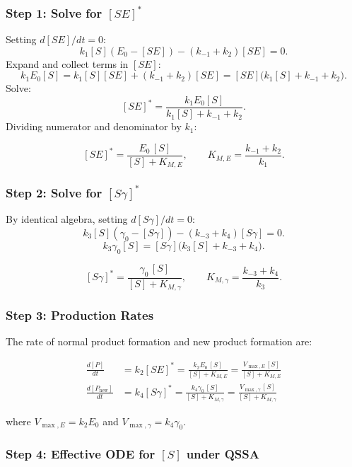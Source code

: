 \documentclass[12pt]{article}
\newcommand{\KME}{K_{M,E}}
\newcommand{\KMg}{K_{M,\gamma}}
\begin{document}
\subsubsection*{Step 1: Solve for $[SE]^*$}

Setting $d[SE]/dt = 0$:
\[
  k_1[S](E_0 - [SE]) - (k_{-1} + k_2)[SE] = 0.
\]
Expand and collect terms in $[SE]$:
\[
  k_1 E_0 [S] = k_1[S][SE] + (k_{-1} + k_2)[SE] = [SE]\bigl(k_1[S] + k_{-1} + k_2\bigr).
\]
Solve:
\[
  [SE]^* = \frac{k_1 E_0 [S]}{k_1[S] + k_{-1} + k_2}.
\]
Dividing numerator and denominator by $k_1$:

\begin{mdframed}[style=keyresult]
\[
  \boxed{[SE]^* = \frac{E_0\,[S]}{[S] + K_{M,E}}}, \qquad K_{M,E} = \frac{k_{-1}+k_2}{k_1}.
\]
\end{mdframed}

\subsubsection*{Step 2: Solve for $[S\gamma]^*$}

By identical algebra, setting $d[S\gamma]/dt = 0$:
\[
  k_3[S](\gamma_0 - [S\gamma]) - (k_{-3} + k_4)[S\gamma] = 0.
\]
\[
  k_3\gamma_0[S] = [S\gamma]\bigl(k_3[S] + k_{-3} + k_4\bigr).
\]

\begin{mdframed}[style=keyresult]
\[
  \boxed{[S\gamma]^* = \frac{\gamma_0\,[S]}{[S] + K_{M,\gamma}}}, \qquad K_{M,\gamma} = \frac{k_{-3}+k_4}{k_3}.
\]
\end{mdframed}

\subsubsection*{Step 3: Production Rates}

The rate of normal product formation and new product formation are:

\begin{align}
  \frac{d[P]}{dt} &= k_2[SE]^* = \frac{k_2 E_0\,[S]}{[S] + \KME} = \frac{V_{\max,E}\,[S]}{[S]+\KME}
  \label{eq:rateP}\\[8pt]
  \frac{d[P_{\text{new}}]}{dt} &= k_4[S\gamma]^* = \frac{k_4\gamma_0\,[S]}{[S]+\KMg} = \frac{V_{\max,\gamma}\,[S]}{[S]+\KMg}
  \label{eq:ratePnew}
\end{align}

where $V_{\max,E} = k_2 E_0$ and $V_{\max,\gamma} = k_4\gamma_0$.

\subsubsection*{Step 4: Effective ODE for $[S]$ under QSSA}
\end{document}
